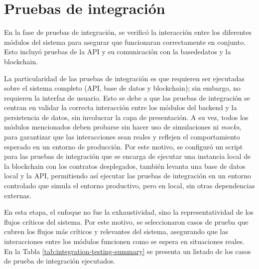 \section{Pruebas de integración}
\label{sec:integration-testing-details}

En la fase de pruebas de integración, se verificó la interacción entre los diferentes módulos del sistema para asegurar que funcionaran correctamente en conjunto. Esto incluyó pruebas de la API y su comunicación con la \gls{basededatos} y la \gls{blockchain}. 

La particularidad de las pruebas de integración es que requieren ser ejecutadas sobre el sistema completo (API, base de datos y blockchain); sin embargo, no requieren la interfaz de usuario. Esto se debe a que las pruebas de integración se centran en validar la correcta interacción entre los módulos del backend y la persistencia de datos, sin involucrar la capa de presentación. A su vez, todos los módulos mencionados deben probarse sin hacer uso de simulaciones ni \textit{mocks}, para garantizar que las interacciones sean reales y reflejen el comportamiento esperado en un entorno de producción. Por este motivo, se configuró un script para las pruebas de integración que se encarga de ejecutar una instancia local de la blockchain con los contratos desplegados, también levanta una base de datos local y la API, permitiendo así ejecutar las pruebas de integración en un entorno controlado que simula el entorno productivo, pero en local, sin otras dependencias externas. 

En esta etapa, el enfoque no fue la exhaustividad, sino la representatividad de los flujos críticos del sistema. Por este motivo, se seleccionaron casos de prueba que cubren los flujos más críticos y relevantes del sistema, asegurando que las interacciones entre los módulos funcionen como se espera en situaciones reales. En la Tabla \ref{tab:integration-testing-summary} se presenta un listado de los casos de prueba de integración ejecutados.

